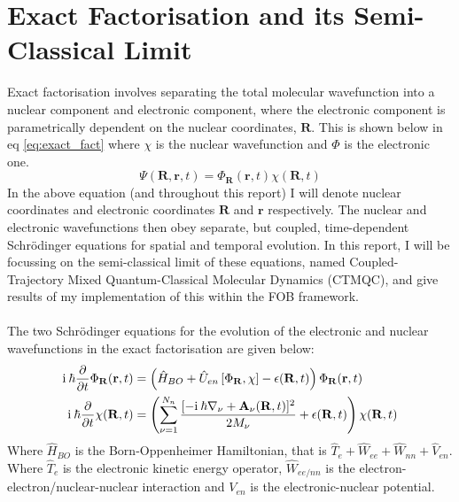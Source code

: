 \section{Exact Factorisation and its Semi-Classical Limit}
Exact factorisation \cite{abedi_exact_2010} involves separating the total molecular wavefunction into a nuclear component and electronic component, where the electronic component is parametrically dependent on the nuclear coordinates, $\mathbf{R}$. This is shown below in eq \eqref{eq:exact_fact} where $\chi$ is the nuclear wavefunction and $\Phi$ is the electronic one.
\begin{equation}
 \Psi(\mathbf{R}, \mathbf{r}, t) = \Phi_{\mathbf{R}}(\mathbf{r}, t) \chi(\mathbf{R}, t)
 \label{eq:exact_fact}
 \end{equation}
 In the above equation (and throughout this report) I will denote nuclear coordinates and electronic coordinates $\mathbf{R}$ and $\mathbf{r}$ respectively. The nuclear and electronic wavefunctions then obey separate, but coupled, time-dependent Schr\"odinger equations for spatial and temporal evolution. In this report, I will be focussing on the semi-classical limit of these equations, named Coupled-Trajectory Mixed Quantum-Classical Molecular Dynamics (CTMQC), and give results of my implementation of this within the FOB framework.
\\\\
The two Schr\"odinger equations for the evolution of the electronic and nuclear wavefunctions in the exact factorisation \cite{abedi_exact_2010} are given below:
\begin{align}
	\mathrm{i} \: \hbar \frac{\partial}{\partial t} \Phi_{\mathbf{R}}(\mathbf{r}, t) &= \left( \hat{H}_{BO} + \hat{U}_{en}\left[ \Phi_{\mathbf{R}}, \chi\right] - \epsilon(\mathbf{R}, t) \right) \Phi_{\mathbf{R}} (\mathbf{r}, t)
  \label{eq:electronic_exact}
\\
	\mathrm{i} \: \hbar \frac{\partial}{\partial t} \chi (\mathbf{R}, t) &= \left( \sum_{\nu = 1}^{N_{n}} \frac{[-\mathrm{i} \: \hbar\nabla_{\nu} + \mathbf{A}_{\nu}(\mathbf{R}, t)]^2}{2 M_{\nu}} + \epsilon(\mathbf{R}, t)\right) \chi (\mathbf{R}, t)
  \label{eq:nuclear_exact}
\end{align}
Where $\hat{H}_{BO}$ is the Born-Oppenheimer Hamiltonian, that is $\hat{T}_{e} + \hat{W}_{ee} + \hat{W}_{nn} + \hat{V}_{en}$. Where $\hat{T}_{e}$ is the electronic kinetic energy operator, $\hat{W}_{ee/nn}$ is the electron-electron/nuclear-nuclear interaction and $V_{en}$ is the electronic-nuclear potential.
\\\\
